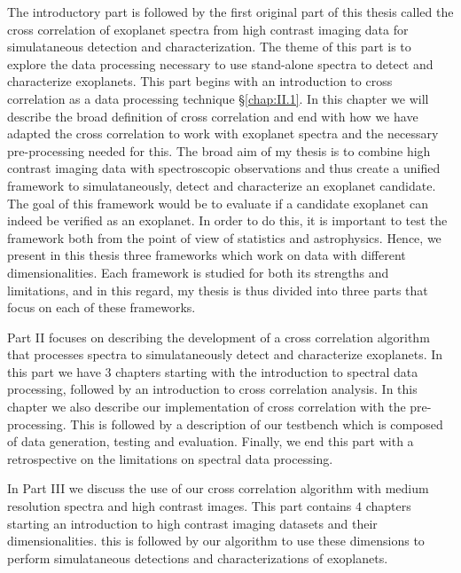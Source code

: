 The introductory part is followed by the first original part of this thesis called the cross correlation of exoplanet spectra from high contrast imaging data for simulataneous detection and characterization.
The theme of this part is to explore the data processing necessary to use stand-alone spectra to detect and characterize exoplanets.
This part begins with an introduction to cross correlation as a data processing technique \S \ref{chap:II.1}. 
In this chapter we will describe the broad definition of cross correlation and end with how we have adapted the cross correlation to  work with exoplanet spectra and the necessary pre-processing needed for this.
The broad aim of my thesis is to combine high contrast imaging data with spectroscopic observations and thus create a unified framework to simulataneously,
detect and characterize an exoplanet candidate.
The goal of this framework would be to evaluate if a candidate exoplanet can indeed be verified as an exoplanet.
In order to do this, it is important to test the framework both from the point of view of statistics and astrophysics.
Hence, we present in this thesis three frameworks which work on data with different dimensionalities.
Each framework is studied for both its strengths and limitations, and in this regard, my thesis is thus divided into three parts that focus on each of these frameworks.

Part II focuses on describing the development of a cross correlation algorithm that processes spectra to simulataneously\@
detect and characterize exoplanets.
In this part we have $3$ chapters starting with the introduction to spectral data processing, followed by an introduction
to cross correlation analysis. 
In this chapter we also describe our implementation of cross correlation with the pre-processing.
This is followed by a description of our testbench which is composed of data generation, testing and evaluation.
Finally, we end this part with a retrospective on the limitations on spectral data processing. 

In Part III we discuss the use of our cross correlation algorithm with medium resolution spectra and high contrast images.
This part contains $4$ chapters starting an introduction to high contrast imaging datasets and their dimensionalities.
this is followed by our algorithm to use these dimensions to perform simulataneous detections and characterizations of exoplanets.

